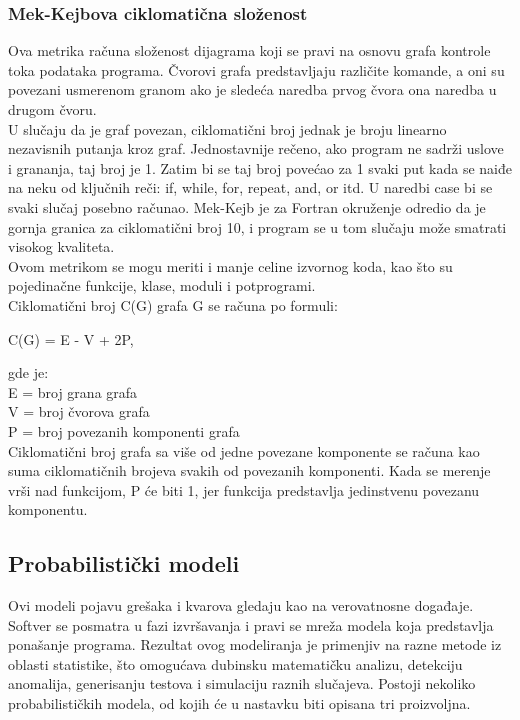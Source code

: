 \documentclass[a4paper]{article}
\begin{document}
\subsubsection{Mek-Kejbova ciklomatična složenost}
\label{subsec:mekkejb}

Ova metrika računa složenost dijagrama koji se pravi na osnovu grafa kontrole toka podataka programa. Čvorovi grafa predstavljaju različite komande, a oni su povezani usmerenom granom ako je sledeća naredba prvog čvora ona naredba u drugom čvoru. \\
U slučaju da je graf povezan, ciklomatični broj jednak je broju linearno nezavisnih putanja kroz graf. Jednostavnije rečeno, ako program ne sadrži uslove i grananja, taj broj je 1. Zatim bi se taj broj povećao za 1 svaki put kada se naiđe na neku od ključnih reči: if, while, for, repeat, and, or itd. U naredbi case bi se svaki slučaj posebno računao. Mek-Kejb je za Fortran okruženje odredio da je gornja granica za ciklomatični broj 10, i program se u tom slučaju može smatrati visokog kvaliteta.\cite{mccabe_fortran}\\
Ovom metrikom se mogu meriti i manje celine izvornog koda, kao što su pojedinačne funkcije, klase, moduli i potprogrami.\\
Ciklomatični broj C(G) grafa G se računa po formuli:
\begin{center}
C(G) = E - V + 2P,
\end{center}
gde je:\\
E = broj grana grafa\\
V = broj čvorova grafa\\
P = broj povezanih komponenti grafa\\

Ciklomatični broj grafa sa više od jedne povezane komponente se računa kao suma ciklomatičnih brojeva svakih od povezanih komponenti. Kada se merenje vrši nad funkcijom,  P će biti 1, jer funkcija predstavlja jedinstvenu povezanu komponentu.\\

\subsection{Probabilistički modeli}
\label{sec:probabilisticki}

Ovi modeli pojavu grešaka i kvarova gledaju kao na verovatnosne događaje. Softver se posmatra u fazi izvršavanja i pravi se mreža modela koja predstavlja ponašanje programa. Rezultat ovog modeliranja je primenjiv na razne metode iz oblasti statistike, što omogućava dubinsku matematičku analizu, detekciju anomalija, generisanju testova i simulaciju raznih slučajeva. Postoji nekoliko probabilističkih modela, od kojih će u nastavku biti opisana tri proizvoljna. \\
\end{document}
